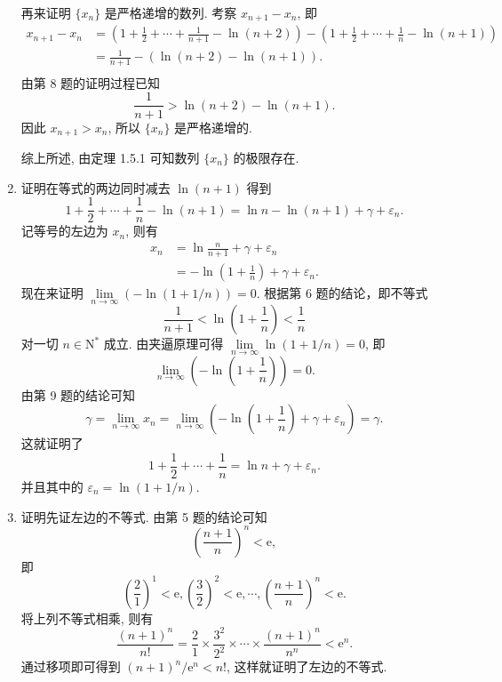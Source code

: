 \documentclass[12pt, a4paper]{article}
\begin{document}
\begin{enumerate}
        再来证明 $\{x_n\}$ 是严格递增的数列. 考察 $x_{n+1} - x_n$, 即
        \begin{align*}
            x_{n+1} - x_n &= \left(1 + \frac12 + \cdots + \frac{1}{n+1} - \ln(n+2)\right) - \left(1 + \frac12 + \cdots + \frac1n - \ln(n+1)\right) \\
            &= \frac{1}{n+1} - \left(\ln(n+2) - \ln(n+1)\right). \\
        \end{align*}
        由第 8 题的证明过程已知 
        \[
            \frac{1}{n+1} > \ln(n+2) - \ln(n+1).
        \]
        因此 $x_{n+1} > x_n$, 所以 $\{x_n\}$ 是严格递增的.
        
        综上所述, 由定理 1.5.1 可知数列 $\{x_n\}$ 的极限存在.
    \item {\heiti 证明}\quad 在等式的两边同时减去 $\ln(n+1)$ 得到
        \begin{equation*}
            1 + \frac12 + \cdots + \frac1n - \ln(n+1) = \ln n - \ln(n+1) + \gamma + \varepsilon_n.
        \end{equation*}
        记等号的左边为 $x_n$, 则有
        \begin{align*}
            x_n &= \ln\frac{n}{n+1} + \gamma + \varepsilon_n \\
            &= -\ln\left(1+\frac1n\right) + \gamma + \varepsilon_n.
        \end{align*}
        现在来证明 $\lim\limits_{n\to\infty}(-\ln(1 + 1/n)) = 0$. 根据第 6 题的结论，即不等式
        \[
            \frac{1}{n+1} < \ln\left(1 + \frac1n\right) < \frac1n    
        \]
        对一切 $n \in \mathrm{N}^*$ 成立. 由夹逼原理可得 $\lim\limits_{n\to\infty}\ln(1 + 1/n) = 0$, 即
        \[
            \lim\limits_{n\to\infty}\left(-\ln\left(1 + \frac1n\right)\right) = 0.  
        \]
        由第 9 题的结论可知
        \[
            \gamma = \lim\limits_{n\to\infty}x_n = \lim\limits_{n\to\infty}\left(-\ln\left(1 + \frac1n\right) + \gamma + \varepsilon_n\right) = \gamma.
        \]
        这就证明了
        \[
            1 + \frac12 + \cdots + \frac1n = \ln n + \gamma + \varepsilon_n.  
        \]
        并且其中的 $\varepsilon_n = \ln(1 + 1/n)$.
    \item {\heiti 证明}\quad 先证左边的不等式. 由第 5 题的结论可知
        \[
            \left(\frac{n+1}{n}\right)^n < \mathrm{e},    
        \]
        即
        \begin{equation*}
            \left(\frac21\right)^1 < \mathrm{e},
            \left(\frac32\right)^2 < \mathrm{e},
            \cdots,
            \left(\frac{n+1}{n}\right)^n < \mathrm{e}.
        \end{equation*}
        将上列不等式相乘, 则有
        \[
            \frac{(n+1)^n}{n!} = \frac21\times\frac{3^2}{2^2}\times\cdots\times\frac{(n+1)^n}{n^n} < \mathrm{e}^n.    
        \]
        通过移项即可得到 $(n+1)^n/\mathrm{e}^n < n!$, 这样就证明了左边的不等式.


\end{enumerate}
\end{document}
